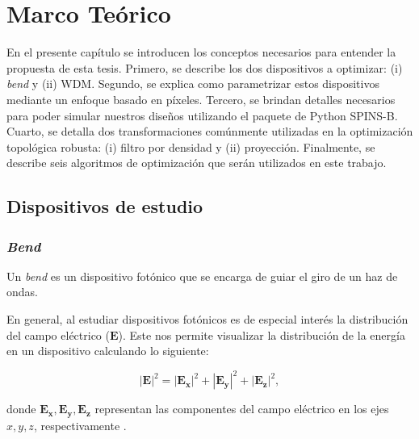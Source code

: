 \chapter{Marco  Teórico}\label{chapter:theory}

En el presente capítulo se introducen los conceptos necesarios para entender la propuesta de esta tesis.
Primero, se describe los dos dispositivos a optimizar: (i) \emph{bend} y (ii) WDM.
Segundo, se explica como parametrizar estos dispositivos mediante un enfoque basado en píxeles.
Tercero, se brindan detalles necesarios para poder simular nuestros diseños utilizando el paquete de Python
SPINS-B.
Cuarto, se detalla dos transformaciones comúnmente utilizadas en la optimización topológica robusta: 
(i) filtro por densidad y (ii) proyección.
Finalmente, se describe seis algoritmos de optimización que serán utilizados en este trabajo.

\section{Dispositivos de estudio}

\subsection{\emph{Bend}}

Un \emph{bend} es un dispositivo fotónico que se encarga de guiar el giro de un haz de ondas.

En general, al estudiar dispositivos fotónicos es de especial interés la
distribución del campo eléctrico ($\boldsymbol{E}$).
Este nos permite visualizar la distribución de la energía en un dispositivo calculando lo siguiente:

\begin{equation}
  |\boldsymbol{E}|^2 = |\boldsymbol{E_x}|^2+|\boldsymbol{E_y}|^2+|\boldsymbol{E_z}|^2,
\label{eq:field}
\end{equation}

donde $\boldsymbol{E_x}, \boldsymbol{E_y}, \boldsymbol{E_z}$ representan las componentes del campo eléctrico
en los ejes $x, y, z$, respectivamente
\citep{LukasChrostowski2010}.

